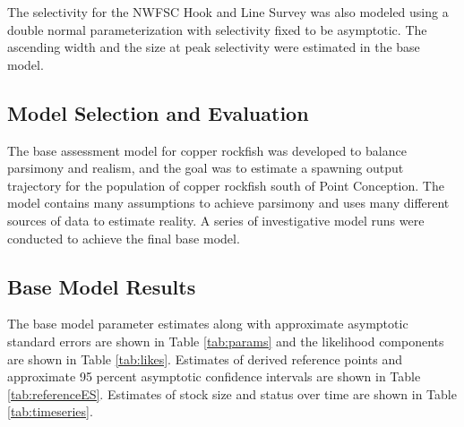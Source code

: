 \documentclass[11pt,
  english,
  a4paper,
]{article}
\begin{document}
\leavevmode\tagmcend\tagstructend\par


The selectivity for the NWFSC Hook and Line Survey was also modeled using a double normal parameterization with selectivity fixed to be asymptotic. The ascending width and the size at peak selectivity were estimated in the base model.

\leavevmode\tagmcend\tagstructend\par


\hypertarget{model-selection-and-evaluation}{%
\subsection{Model Selection and Evaluation}\label{model-selection-and-evaluation}}

\leavevmode\tagmcend\tagstructend


The base assessment model for copper rockfish was developed to balance parsimony and realism, and the goal was to estimate a spawning output trajectory for the population of copper rockfish south of Point Conception. The model contains many assumptions to achieve parsimony and uses many different sources of data to estimate reality. A series of investigative model runs were conducted to achieve the final base model.

\leavevmode\tagmcend\tagstructend\par


\hypertarget{base-model-results}{%
\subsection{Base Model Results}\label{base-model-results}}

\leavevmode\tagmcend\tagstructend


The base model parameter estimates along with approximate asymptotic standard errors are shown in Table \ref{tab:params} and the likelihood components are shown in Table \ref{tab:likes}. Estimates of derived reference points and approximate 95 percent asymptotic confidence intervals are shown in Table \ref{tab:referenceES}. Estimates of stock size and status over time are shown in Table \ref{tab:timeseries}.
\end{document}
